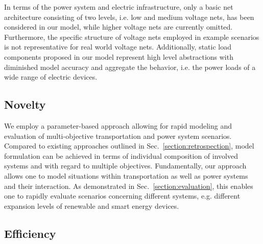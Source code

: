 In terms of the power system and electric infrastructure, only a basic net architecture consisting of two levels, i.e. low and medium voltage nets, has been considered in our model, while higher voltage nets are currently omitted. Furthermore, the specific structure of voltage nets employed in example scenarios is not representative for real world voltage nets. Additionally, static load components proposed in our model represent high level abstractions with diminished model accuracy and aggregate the behavior, i.e. the power loads of a wide range of electric devices.


\subsection{Novelty}

We employ a parameter-based approach allowing for rapid modeling and evaluation of multi-objective transportation and power system scenarios. Compared to existing approaches outlined in Sec.~\ref{section:retrospection}, model formulation can be achieved in terms of individual composition of involved systems and with regard to multiple objectives. Fundamentally, our approach allows one to model situations within transportation as well as power systems and their interaction. As demonstrated in Sec.~\ref{section:evaluation}, this enables one to rapidly evaluate scenarios concerning different systems, e.g. different expansion levels of renewable and smart energy devices.

\subsection{Efficiency}


